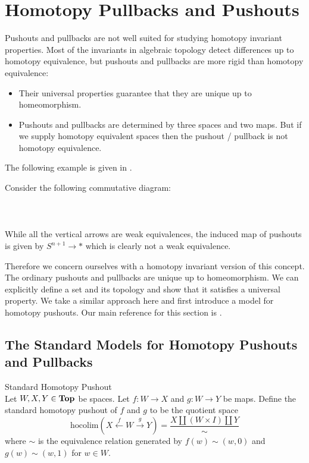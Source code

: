\documentclass[a4paper]{article}
\begin{document}
\pagebreak
\section{Homotopy Pullbacks and Pushouts}
Pushouts and pullbacks are not well suited for studying homotopy invariant properties. Most of the invariants in algebraic topology detect differences up to homotopy equivalence, but pushouts and pullbacks are more rigid than homotopy equivalence: 

\begin{itemize}
\item Their universal properties guarantee that they are unique up to homeomorphism. 
\item Pushouts and pullbacks are determined by three spaces and two maps. But if we supply homotopy equivalent spaces then the pushout / pullback is not homotopy equivalence. 
\end{itemize}

The following example is given in \cite{PHC}. 

\begin{eg}{}{} Consider the following commutative diagram:   
 \\~\\  \\~\\
While all the vertical arrows are weak equivalences, the induced map of pushouts is given by $S^{n+1}\to\ast$ which is clearly not a weak equivalence. 
\end{eg}

Therefore we concern ourselves with a homotopy invariant version of this concept. The ordinary pushouts and pullbacks are unique up to homeomorphism. We can explicitly define a set and its topology and show that it satisfies a universal property. We take a similar approach here and first introduce a model for homotopy pushouts. Our main reference for this section is \cite{CHT}. 

\subsection{The Standard Models for Homotopy Pushouts and Pullbacks}
\begin{defn}{Standard Homotopy Pushout}{}\\
Let $W,X,Y\in\bold{Top}$ be spaces. Let $f:W\to X$ and $g:W\to Y$ be maps. Define the standard homotopy pushout of $f$ and $g$ to be the quotient space $$\text{hocolim}(X\overset{f}{\leftarrow}W\overset{g}{\rightarrow}Y)=\frac{X\amalg(W\times I)\amalg Y}{\sim}$$ where $\sim$ is the equivalence relation generated by $f(w)\sim (w,0)$ and $g(w)\sim(w,1)$ for $w\in W$. 
\end{defn}
\end{document}
